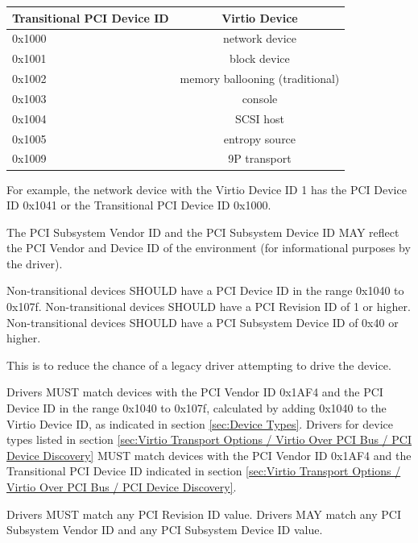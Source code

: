 \begin{tabular}{|l|c|}
\hline
Transitional PCI Device ID  &  Virtio Device    \\
\hline \hline
0x1000      &   network device     \\
\hline
0x1001     &   block device     \\
\hline
0x1002     & memory ballooning (traditional)  \\
\hline
0x1003     &      console       \\
\hline
0x1004     &     SCSI host      \\
\hline
0x1005     &  entropy source    \\
\hline
0x1009     &   9P transport     \\
\hline
\end{tabular}

For example, the network device with the Virtio Device ID 1
has the PCI Device ID 0x1041 or the Transitional PCI Device ID 0x1000.

The PCI Subsystem Vendor ID and the PCI Subsystem Device ID MAY reflect
the PCI Vendor and Device ID of the environment (for informational purposes by the driver).

Non-transitional devices SHOULD have a PCI Device ID in the range
0x1040 to 0x107f.
Non-transitional devices SHOULD have a PCI Revision ID of 1 or higher.
Non-transitional devices SHOULD have a PCI Subsystem Device ID of 0x40 or higher.

This is to reduce the chance of a legacy driver attempting
to drive the device.

Drivers MUST match devices with the PCI Vendor ID 0x1AF4 and
the PCI Device ID in the range 0x1040 to 0x107f,
calculated by adding 0x1040 to the Virtio Device ID,
as indicated in section \ref{sec:Device Types}.
Drivers for device types listed in section \ref{sec:Virtio
Transport Options / Virtio Over PCI Bus / PCI Device Discovery}
MUST match devices with the PCI Vendor ID 0x1AF4 and
the Transitional PCI Device ID indicated in section
 \ref{sec:Virtio
Transport Options / Virtio Over PCI Bus / PCI Device Discovery}.

Drivers MUST match any PCI Revision ID value.
Drivers MAY match any PCI Subsystem Vendor ID and any
PCI Subsystem Device ID value.


